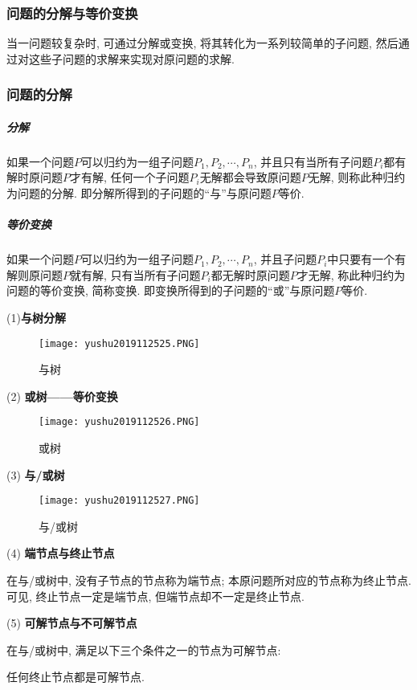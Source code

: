 \subsubsection{问题的分解与等价变换}
当一问题较复杂时, 可通过分解或变换, 将其转化为一系列较简单的子问题, 然后通过对这些子问题的求解来实现对原问题的求解.
\subsubsection{问题的分解}
\subparagraph{分解}
如果一个问题$P$可以归约为一组子问题$P_1,P_2,\cdots,P_n$, 并且只有当所有子问题$P_i$都有解时原问题$P$才有解, 任何一个子问题$P_i$无解都会导致原问题$P$无解, 则称此种归约为问题的分解.
即分解所得到的子问题的“与”与原问题$P$等价.
\subparagraph{等价变换}
如果一个问题$P$可以归约为一组子问题$P_1,P_2,\cdots,P_n$, 并且子问题$P_i$中只要有一个有解则原问题$P$就有解, 只有当所有子问题$P_i$都无解时原问题$P$才无解, 称此种归约为问题的等价变换, 简称变换.
即变换所得到的子问题的“或”与原问题$P$等价.

(1)\textbf{与树分解}
\begin{figure}[H]
\centering
\texttt{[image: yushu2019112525.PNG]}
\caption{与树 }
\label{AI32fig25}
\end{figure}

(2) \textbf{或树——等价变换}
\begin{figure}[H]
\centering
\texttt{[image: yushu2019112526.PNG]}
\caption{或树 }
\label{AI32fig26}
\end{figure}

(3) \textbf{与/或树}
\begin{figure}[H]
\centering
\texttt{[image: yushu2019112527.PNG]}
\caption{与/或树 }
\label{AI32fig27}
\end{figure}
(4) \textbf{端节点与终止节点}

在与/或树中, 没有子节点的节点称为端节点; 本原问题所对应的节点称为终止节点. 可见, 终止节点一定是端节点, 但端节点却不一定是终止节点.

(5) \textbf{可解节点与不可解节点}

在与/或树中, 满足以下三个条件之一的节点为可解节点:

 任何终止节点都是可解节点.

